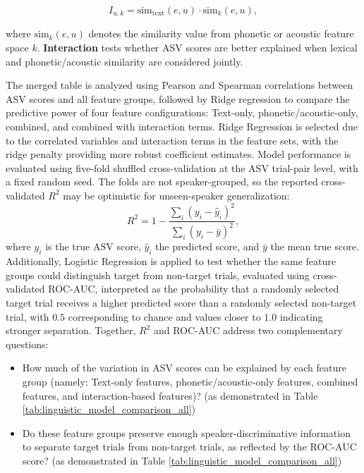 \documentclass[12pt,leqno,a4paper]{article}
\begin{document}
\begin{equation}
I_{u,k} =
\mathrm{sim}_{\mathrm{text}}(e,u) \cdot \mathrm{sim}_{k}(e,u),
\end{equation}

where $\mathrm{sim}_{k}(e,u)$ denotes the similarity value from phonetic or acoustic feature space $k$. \textbf{Interaction} tests whether ASV scores are better explained when lexical and phonetic/acoustic similarity are considered jointly.

The merged table is analyzed using Pearson and Spearman correlations between ASV scores and all feature groups, followed by Ridge regression to compare the predictive power of four feature configurations: Text-only, phonetic/acoustic-only, combined, and combined with interaction terms. 
Ridge Regression is selected due to the correlated variables and interaction terms in the feature sets, with the ridge penalty providing more robust coefficient estimates. Model performance is evaluated using five-fold shuffled cross-validation at the ASV trial-pair level, with a fixed random seed. The folds are not speaker-grouped, so the reported cross-validated $R^2$ may be optimistic for unseen-speaker generalization:
\begin{equation}
R^2 = 1 - 
\frac{\sum_i (y_i - \hat{y}_i)^2}
{\sum_i (y_i - \bar{y})^2},
\end{equation}
where $y_i$ is the true ASV score, $\hat{y}_i$ the predicted score, and $\bar{y}$ the mean true score. 
Additionally, Logistic Regression is applied to test whether the same feature groups could distinguish target from non-target trials, evaluated using cross-validated ROC-AUC, 
interpreted as the probability that a randomly selected target trial receives a higher predicted score than a randomly selected non-target trial, with $0.5$ corresponding to chance and values closer to $1.0$ indicating stronger separation. 
Together, $R^2$ and ROC-AUC address two complementary questions: 

\begin{itemize}
    \item How much of the variation in ASV scores can be explained by each feature group (namely: Text-only features, phonetic/acoustic-only features, combined features, and interaction-based features)? (as demonstrated in Table \ref{tab:linguistic_model_comparison_all})
     \item Do these feature groups preserve enough speaker-discriminative information to separate target trials from non-target trials, as reflected by the ROC-AUC score? (as demonstrated in Table \ref{tab:linguistic_model_comparison_all})
\end{itemize}
\end{document}
